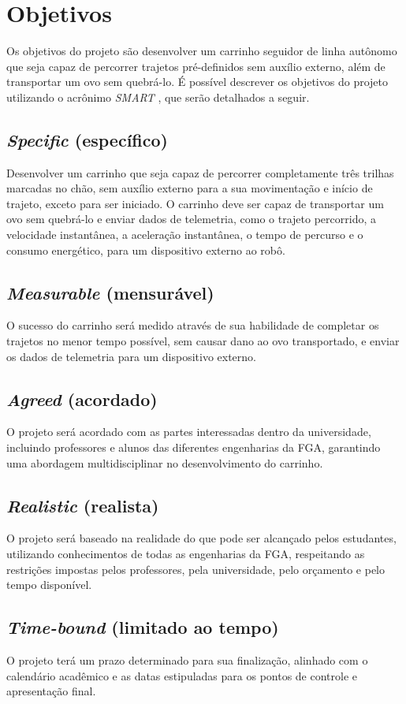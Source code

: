 \section{Objetivos}

Os objetivos do projeto são desenvolver um carrinho seguidor de linha autônomo
que seja capaz de percorrer trajetos pré-definidos sem auxílio externo, além de
transportar um ovo sem quebrá-lo. É possível descrever os objetivos do projeto
utilizando o acrônimo \textit{SMART}
\cite{University-of-California:SMART-Goals}, que serão detalhados a seguir.

\subsection{\textit{Specific} (específico)}

Desenvolver um carrinho que seja capaz de percorrer completamente três
trilhas marcadas no chão, sem auxílio externo para a sua movimentação e
início de trajeto, exceto para ser iniciado. O carrinho deve ser capaz de
transportar um ovo sem quebrá-lo e enviar dados de telemetria, como o trajeto
percorrido, a velocidade instantânea, a aceleração instantânea, o tempo de
percurso e o consumo energético, para um dispositivo externo ao robô.
 
\subsection{\textit{Measurable} (mensurável)}

O sucesso do carrinho será medido através de sua habilidade de completar os
trajetos no menor tempo possível, sem causar dano ao ovo transportado, e
enviar os dados de telemetria para um dispositivo externo.

\subsection{\textit{Agreed} (acordado)}

O projeto será acordado com as partes interessadas dentro da universidade,
incluindo professores e alunos das diferentes engenharias da FGA, garantindo
uma abordagem multidisciplinar no desenvolvimento do carrinho.

\subsection{\textit{Realistic} (realista)}

O projeto será baseado na realidade do que pode ser alcançado pelos estudantes,
utilizando conhecimentos de todas as engenharias da FGA, respeitando as
restrições impostas pelos professores, pela universidade, pelo orçamento e
pelo tempo disponível.

\subsection{\textit{Time-bound} (limitado ao tempo)}

O projeto terá um prazo determinado para sua finalização, alinhado com o
calendário acadêmico e as datas estipuladas para os pontos de controle e
apresentação final.
